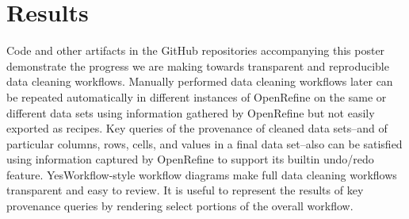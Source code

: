 \section{Results}

Code and other artifacts in the GitHub repositories accompanying this poster \cite{openrefine-provenance-repo, openrefine-reproducibility-repo} demonstrate the progress we are making towards transparent and reproducible data cleaning workflows. Manually performed data cleaning workflows later can be repeated automatically in different instances of OpenRefine on the same or different data sets using information gathered by OpenRefine but not easily exported as recipes. Key queries of the provenance of cleaned data sets--and of particular columns, rows, cells, and values in a final data set--also can be satisfied using information captured by OpenRefine to support its builtin undo/redo feature. YesWorkflow-style workflow diagrams make full data cleaning workflows transparent and easy to review. It is useful to represent the results of key provenance queries by rendering select portions of the overall workflow.